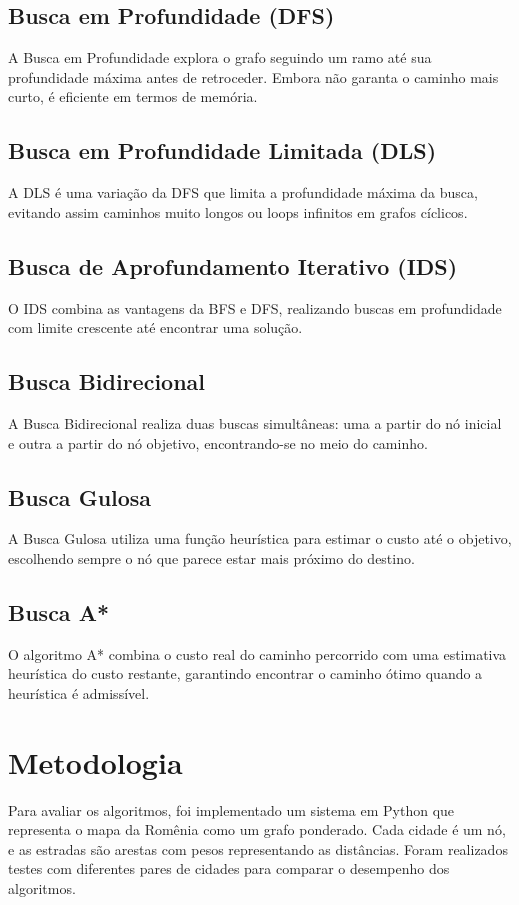 \documentclass[12pt,a4paper]{article}
\begin{document}
\subsection{Busca em Profundidade (DFS)}
A Busca em Profundidade explora o grafo seguindo um ramo até sua profundidade máxima antes de retroceder. Embora não garanta o caminho mais curto, é eficiente em termos de memória.

\subsection{Busca em Profundidade Limitada (DLS)}
A DLS é uma variação da DFS que limita a profundidade máxima da busca, evitando assim caminhos muito longos ou loops infinitos em grafos cíclicos.

\subsection{Busca de Aprofundamento Iterativo (IDS)}
O IDS combina as vantagens da BFS e DFS, realizando buscas em profundidade com limite crescente até encontrar uma solução.

\subsection{Busca Bidirecional}
A Busca Bidirecional realiza duas buscas simultâneas: uma a partir do nó inicial e outra a partir do nó objetivo, encontrando-se no meio do caminho.

\subsection{Busca Gulosa}
A Busca Gulosa utiliza uma função heurística para estimar o custo até o objetivo, escolhendo sempre o nó que parece estar mais próximo do destino.

\subsection{Busca A*}
O algoritmo A* combina o custo real do caminho percorrido com uma estimativa heurística do custo restante, garantindo encontrar o caminho ótimo quando a heurística é admissível.

\section{Metodologia}
Para avaliar os algoritmos, foi implementado um sistema em Python que representa o mapa da Romênia como um grafo ponderado. Cada cidade é um nó, e as estradas são arestas com pesos representando as distâncias. Foram realizados testes com diferentes pares de cidades para comparar o desempenho dos algoritmos.
\end{document}
